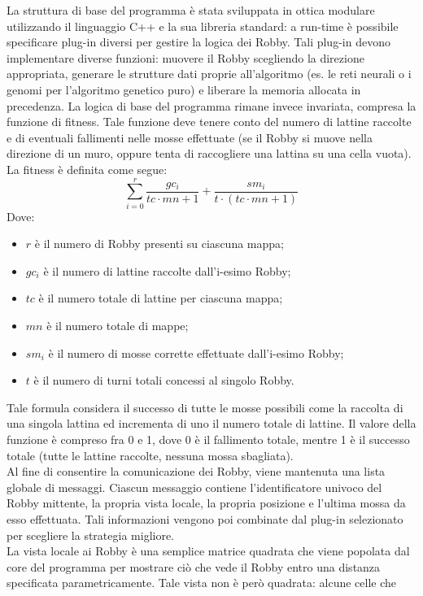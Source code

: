 La struttura di base del programma è stata sviluppata in ottica modulare 
utilizzando il linguaggio C++ e la sua libreria standard: a 
run-time è possibile specificare plug-in diversi per gestire la logica dei 
Robby. Tali plug-in devono implementare diverse funzioni: muovere il Robby 
scegliendo la direzione appropriata, generare le strutture dati proprie 
all'algoritmo (es. le reti neurali o i genomi per l'algoritmo genetico puro) e 
liberare la memoria allocata in precedenza. La logica di base del programma 
rimane invece invariata, compresa la funzione di fitness. Tale funzione 
deve tenere conto del numero di lattine raccolte e di eventuali fallimenti 
nelle mosse effettuate (se il Robby si muove nella direzione di un muro, 
oppure 
tenta di raccogliere una lattina su una cella vuota). La fitness è definita 
come segue:
\[\sum\limits_{i=0}^{r} \frac{gc_i}{tc\cdot mn+1}+\frac{sm_i}{t\cdot (tc 
\cdot mn + 1)}\]
Dove:
\begin{itemize}
 \item $r$ è il numero di Robby presenti su ciascuna mappa;
 \item $gc_i$ è il numero di lattine raccolte dall'i-esimo Robby;
 \item $tc$ è il numero totale di lattine per ciascuna mappa;
 \item $mn$ è il numero totale di mappe;
 \item $sm_i$ è il numero di mosse corrette effettuate dall'i-esimo Robby;
 \item $t$ è il numero di turni totali concessi al singolo Robby.
\end{itemize}
Tale formula considera il successo di tutte le mosse possibili come la raccolta 
di una singola lattina ed incrementa di uno il numero totale di lattine. Il 
valore della funzione è compreso fra 0 e 1, dove 0 è il fallimento totale, 
mentre 1 è il successo totale (tutte le lattine raccolte, nessuna mossa 
sbagliata).
\\
Al fine di consentire la comunicazione dei Robby, viene mantenuta una lista 
globale di messaggi. Ciascun messaggio contiene l'identificatore univoco del 
Robby mittente, la propria vista locale, la propria posizione e l'ultima mossa 
da esso effettuata. Tali informazioni vengono poi combinate dal plug-in 
selezionato per scegliere la strategia migliore.
\\
La vista locale ai Robby è una semplice matrice quadrata che viene popolata dal 
core del programma per mostrare ciò che vede il Robby entro una distanza 
specificata parametricamente. Tale vista non è però quadrata: alcune celle che 

